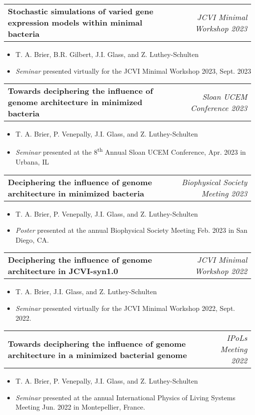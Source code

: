 \documentclass[letterpaper,10pt]{article}
\makeatletter
\newcommand{\experienceitemvspace}{3pt}
\newcommand{\resumeItem}[1]{
  \item{
    {#1 \vspace{-4pt}}
  }
}
\newcommand{\titleItem}[1]{
  \textbf{#1}
}
\newcommand{\resumeProjectHeading}[2]{
    \item
    \begin{tabular*}{0.97\textwidth}{l@{\extracolsep{\fill}}r}
      #1 & \textit{ #2} \\
    \end{tabular*}\vspace{-9pt}
}
\newcommand{\resumeItemListStart}{
\begin{itemize}}
\newcommand{\resumeItemListEnd}{
\end{itemize}\vspace{-8pt}}
\makeatother
\begin{document}
	\vspace{\experienceitemvspace}
	\resumeProjectHeading
	{\titleItem{{Stochastic simulations of varied gene expression models within minimal bacteria}}} {\textcolor{color2}{JCVI Minimal Workshop 2023}}
	\vspace{2pt}
	\resumeItemListStart
	\resumeItem{\textcolor{color1}{T. A. Brier}, B.R. Gilbert, J.I. Glass, and Z. Luthey-Schulten}
	\resumeItem{\emph{Seminar} presented virtually for the JCVI Minimal Workshop 2023, Sept. 2023}
	\resumeItemListEnd
	
	\vspace{\experienceitemvspace}
	\resumeProjectHeading
	{\titleItem{{Towards deciphering the influence of genome architecture in minimized bacteria}}} {\textcolor{color2}{Sloan UCEM Conference 2023}}
	\vspace{2pt}
	\resumeItemListStart
	\resumeItem{\textcolor{color1}{T. A. Brier}, P. Venepally, J.I. Glass, and Z. Luthey-Schulten}
	\resumeItem{\emph{Seminar} presented at the 8\textsuperscript{th} Annual Sloan UCEM Conference,  Apr. 2023 in Urbana, IL}
	\resumeItemListEnd
	
	\vspace{\experienceitemvspace}
	\resumeProjectHeading
	{\titleItem{{Deciphering the influence of genome architecture in minimized bacteria}}} {\textcolor{color2}{Biophysical Society Meeting 2023}}
	\vspace{2pt}
	\resumeItemListStart
	\resumeItem{\textcolor{color1}{T. A. Brier}, P. Venepally, J.I. Glass, and Z. Luthey-Schulten}
	\resumeItem{\emph{Poster} presented at the annual Biophysical Society Meeting Feb. 2023 in San Diego, CA.}
	\resumeItemListEnd
	
	\vspace{\experienceitemvspace}
	\resumeProjectHeading
	{\titleItem{{Deciphering the influence of genome architecture in JCVI-syn1.0}}} {\textcolor{color2}{JCVI Minimal Workshop 2022}}
	\vspace{2pt}
	\resumeItemListStart
	\resumeItem{\textcolor{color1}{T. A. Brier}, J.I. Glass, and Z. Luthey-Schulten}
	\resumeItem{\emph{Seminar} presented virtually for the JCVI Minimal Workshop 2022, Sept. 2022.}
	\resumeItemListEnd
	
	\vspace{\experienceitemvspace}
	\resumeProjectHeading
	{\titleItem{{Towards deciphering the influence of genome architecture in a minimized bacterial genome}}} {\textcolor{color2}{IPoLs Meeting 2022}}
	\vspace{2pt}
	\resumeItemListStart
	\resumeItem{\textcolor{color1}{T. A. Brier}, P. Venepally, J.I. Glass, and Z. Luthey-Schulten}
	\resumeItem{\emph{Seminar} presented at the annual International Physics of Living Systems Meeting Jun. 2022 in Montepellier, France.}
	\resumeItemListEnd
	
\end{document}
